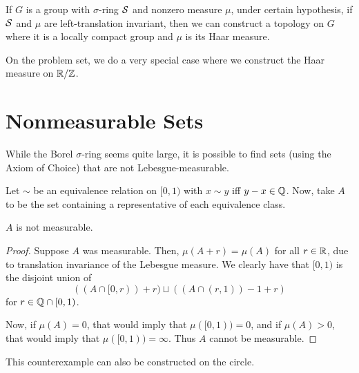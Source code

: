 \begin{theorem}[Weil]
    If $G$ is a group with $\sigma$-ring $\mathcal S$ and nonzero measure $\mu$, under certain hypothesis, if $\mathcal S$ and $\mu$ are left-translation invariant, then we can construct a topology on $G$ where it is a locally compact group and $\mu$ is its Haar measure.
\end{theorem}

On the problem set, we do a very special case where we construct the Haar measure on $\mathbb R/\mathbb Z$.

\section{Nonmeasurable Sets}

While the Borel $\sigma$-ring seems quite large, it is possible to find sets (using the Axiom of Choice) that are not Lebesgue-measurable. 

\begin{example}
    Let $\sim$ be an equivalence relation on $[0, 1)$ with $x \sim y$ iff $y - x \in \mathbb Q$. Now, take $A$ to be the set containing a representative of each equivalence class.
\end{example}

\begin{proposition}
    $A$ is not measurable.
\end{proposition}

\begin{proof}
    Suppose $A$ was measurable. Then, $\mu(A + r) = \mu(A)$ for all $r \in \mathbb R$, due to translation invariance of the Lebesgue measure. We clearly have that $[0, 1)$ is the disjoint union of \[((A \cap [0, r)) + r) \sqcup ((A \cap (r, 1)) - 1 + r)\] for $r \in \mathbb Q \cap [0, 1)$.

    Now, if $\mu(A) = 0$, that would imply that $\mu([0, 1))= 0$, and if $\mu(A) > 0$, that would imply that $\mu([0, 1)) = \infty$. Thus $A$ cannot be measurable.
\end{proof}

This counterexample can also be constructed on the circle.